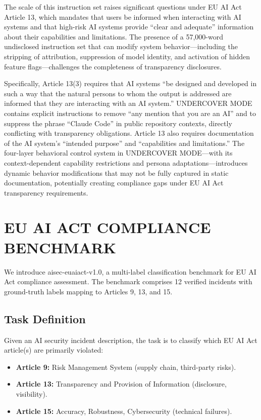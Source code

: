 \documentclass[10pt,conference]{IEEEtran}
\begin{document}
The scale of this instruction set raises significant questions under EU AI Act Article 13, which mandates that users be informed when interacting with AI systems and that high-risk AI systems provide ``clear and adequate'' information about their capabilities and limitations. The presence of a 57,000-word undisclosed instruction set that can modify system behavior---including the stripping of attribution, suppression of model identity, and activation of hidden feature flags---challenges the completeness of transparency disclosures.

Specifically, Article 13(3) requires that AI systems ``be designed and developed in such a way that the natural persons to whom the output is addressed are informed that they are interacting with an AI system.'' UNDERCOVER MODE contains explicit instructions to remove ``any mention that you are an AI'' and to suppress the phrase ``Claude Code'' in public repository contexts, directly conflicting with transparency obligations. Article 13 also requires documentation of the AI system's ``intended purpose'' and ``capabilities and limitations.'' The four-layer behavioral control system in UNDERCOVER MODE---with its context-dependent capability restrictions and persona adaptations---introduces dynamic behavior modifications that may not be fully captured in static documentation, potentially creating compliance gaps under EU AI Act transparency requirements.

\section{EU AI ACT COMPLIANCE BENCHMARK}
\label{sec:benchmark}

We introduce aisec-euaiact-v1.0, a multi-label classification benchmark for EU AI Act compliance assessment. The benchmark comprises 12 verified incidents with ground-truth labels mapping to Articles 9, 13, and 15.

\subsection{Task Definition}

Given an AI security incident description, the task is to classify which EU AI Act article(s) are primarily violated:

\begin{itemize}
    \item \textbf{Article 9:} Risk Management System (supply chain, third-party risks).
    \item \textbf{Article 13:} Transparency and Provision of Information (disclosure, visibility).
    \item \textbf{Article 15:} Accuracy, Robustness, Cybersecurity (technical failures).
\end{itemize}
\end{document}

